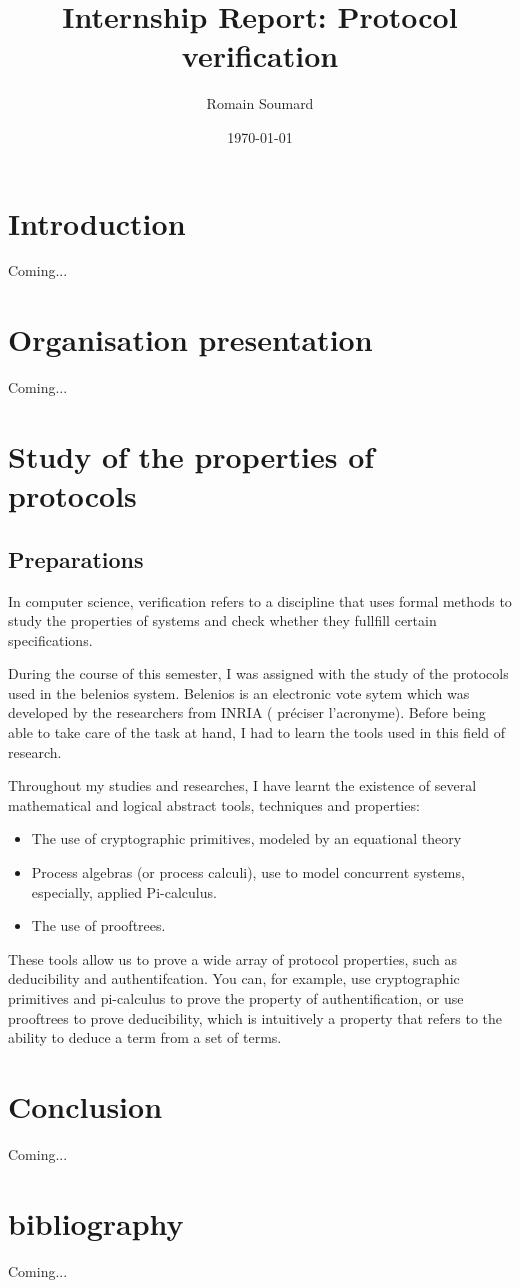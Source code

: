 \documentclass[12pt, a4paper]{report}
\title{\color{blue}Internship Report: Protocol verification}
\author{Romain Soumard}
\date{\today}
\begin{document}
\maketitle

\section{Introduction}

Coming...

\section{Organisation presentation}

Coming...

\section{Study of the properties of protocols}

\subsection{Preparations}

In computer science, verification refers to a discipline that uses formal methods to study the properties of systems and check whether they fullfill certain specifications.

During the course of this semester, I was assigned with the study of the protocols used in the belenios system. Belenios is an electronic vote sytem which was developed by the researchers from INRIA (\color{red} préciser l'acronyme\color{black}). Before being able to take care of the task at hand, I  had to learn the tools used in this field of research.

Throughout my studies and researches, I have learnt the existence of several mathematical and logical abstract tools, techniques and properties:
\begin{itemize}
\item The use of cryptographic primitives, modeled by an equational theory
\item Process algebras (or process calculi), use to model concurrent systems, especially, applied Pi-calculus.
\item The use of prooftrees.
\end{itemize}

These tools allow us to prove a wide array of protocol properties, such as deducibility and authentifcation. You can, for example, use cryptographic primitives and pi-calculus to prove the property of authentification, or use prooftrees to prove deducibility, which is intuitively a property that refers to the ability to deduce a term from a set of terms. 

\section{Conclusion}

Coming...

\section{bibliography}


Coming...
\end{document}
